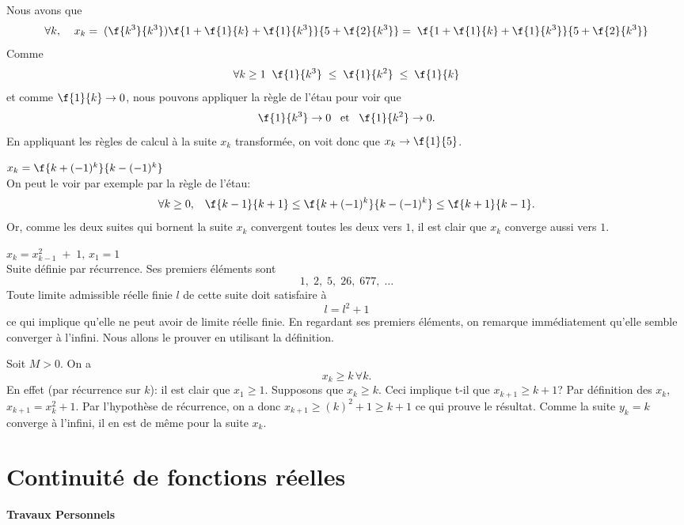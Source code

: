 \noindent Nous avons que \[\forall k, \;\;\;\;x_k =\; (\f{k^3}{k^3})\f{1+\f{1}{k} +\f{1}{k^3}}{5+\f{2}{k^3}}=\;\f{1+\f{1}{k} +\f{1}{k^3}}{5+\f{2}{k^3}} \]
Comme \[\forall k \geq 1\;\; \f{1}{k^3} \; \leq \;\f{1}{k^2}\; \leq \; \f{1}{k}\] et comme $\f{1}{k}\rightarrow 0$, nous pouvons appliquer la règle de l'étau pour voir que \[\f{1}{k^3} \rightarrow 0 \; \; \; {\rm et } \;\; \;\f{1}{k^2} \rightarrow 0.\]
En appliquant les règles de calcul à la suite $x_k$ transformée, on voit donc que $x_k \rightarrow  \f{1}{5}$.

\vspace{0.5cm}
 $x_k = \f{k+(-1)^k}{k-(-1)^k}$\\

\noindent On peut le voir par exemple par la règle de l'étau:
\[\forall k \geq 0, \;\;\; \f{k-1}{k+1} \leq \f{k+(-1)^k}{k-(-1)^k} \leq \f{k+1}{k-1}. \]
Or, comme les deux suites qui bornent la suite $x_k$ convergent toutes les deux vers $1$, il est clair que $x_k$ converge aussi vers $1$.


\vspace{0.5cm}
 $x_k = x_{k-1}^2\;+\;1,\, x_1=1$\\

\noindent Suite définie par récurrence. Ses premiers éléments sont \[1, \; 2, \; 5, \;  26, \; 677, \; \ldots\]
Toute  limite admissible réelle finie $l$  de cette suite doit satisfaire à \[l=l^2+1\] ce qui implique qu'elle ne peut avoir de limite réelle finie. En regardant ses premiers éléments, on remarque immédiatement qu'elle semble converger à l'infini. Nous allons le prouver en utilisant la définition.

\noindent Soit $M> 0$. On a \[x_k \geq k \, \forall k.\] En effet (par récurrence sur $k$): il est clair que $x_1 \geq 1$. Supposons que $x_k \geq k$. Ceci implique t-il que $x_{k+1}\geq k+1$? Par définition des $x_k$, $x_{k+1} = x_k^2+1$. Par l'hypothèse de récurrence, on a donc $x_{k+1}\geq (k)^2 +1\geq k+1$ ce qui prouve le résultat. Comme la suite $y_k=k$ converge à l'infini, il en est de même pour la suite $x_k$.



\section{Continuité de fonctions réelles}


\begin{center}
\LARGE \bf
Travaux Personnels
\end{center}

